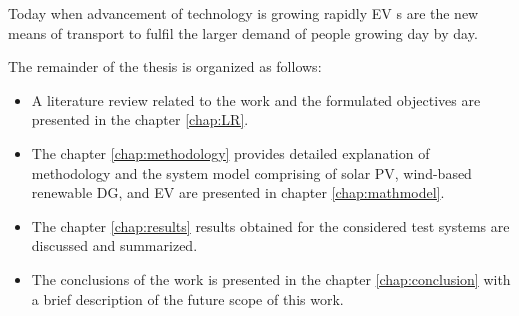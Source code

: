 Today when advancement of technology is growing rapidly EV s are the new means of transport to
fulfil the larger demand of people growing day by day.
\par The remainder of the thesis is organized as follows:
\begin{itemize}
	\item A literature review related to the work and the formulated objectives are presented in the chapter \ref{chap:LR}.
	
	\item The chapter \ref{chap:methodology} provides detailed explanation
	of methodology and the system model comprising of solar PV, wind-based renewable DG, and EV are presented in chapter \ref{chap:mathmodel}.
	\item The chapter \ref{chap:results} results obtained for the considered test systems are discussed and summarized. 
	\item The conclusions of the work is presented in the chapter \ref{chap:conclusion} with a brief description of the future scope of this work.
\end{itemize}
